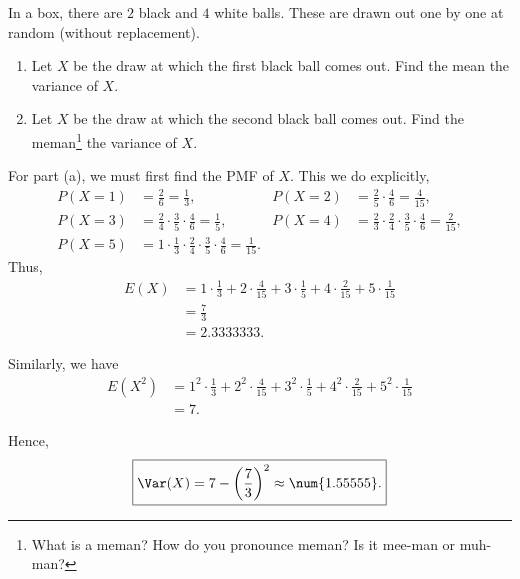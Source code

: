 \begin{problem}[Handout 7, \# 9]
  In a box, there are \(2\) black and \(4\) white balls. These are drawn
  out one by one at random (without replacement).
  \begin{enumerate}[label=(\alph*),noitemsep]
  \item Let \(X\) be the draw at which the first black ball comes out. Find
    the mean the variance of \(X\).
  \item Let \(X\) be the draw at which the second black ball comes
    out. Find the meman\footnote{What is a meman? How do you pronounce
      meman? Is it mee-man or muh-man?} the variance of \(X\).
  \end{enumerate}
\end{problem}
\begin{solution}
  For part (a), we must first find the PMF of \(X\). This we do explicitly,
  \begin{align*}
    P(X=1)&=\frac{2}{6}=\frac{1}{3},
    &P(X=2)&=\frac{2}{5}\cdot\frac{4}{6}=\frac{4}{15},\\
    P(X=3)&=\frac{2}{4}\cdot\frac{3}{5}\cdot\frac{4}{6}=\frac{1}{5},
    &P(X=4)&=\frac{2}{3}\cdot\frac{2}{4}\cdot\frac{3}{5}\cdot\frac{4}{6}=\frac{2}{15},\\
    P(X=5)&=1\cdot\frac{1}{3}\cdot\frac{2}{4}\cdot\frac{3}{5}\cdot\frac{4}{6}=\frac{1}{15}.
  \end{align*}
  Thus,
  \[
    \boxed{
      \begin{aligned}
        E(X)
        &=1\cdot\frac{1}{3}+2\cdot\frac{4}{15}+3\cdot\frac{1}{5}+4\cdot\frac{2}{15}+5\cdot\frac{1}{15}\\
        &=\frac{7}{3}\\
        &=\num{2.3333333}.
      \end{aligned}}
  \]

  Similarly, we have
  \[
    \begin{aligned}
      E(X^2)
      &=1^2\cdot\frac{1}{3}+2^2\cdot\frac{4}{15}+3^2\cdot\frac{1}{5}+4^2\cdot\frac{2}{15}+5^2\cdot\frac{1}{15}\\
      &=7.
    \end{aligned}
  \]

  Hence,
  \[
    \boxed{\Var(X)=7-\left(\frac{7}{3}\right)^2\approx\num{1.55555}.}
  \]


\end{solution}
